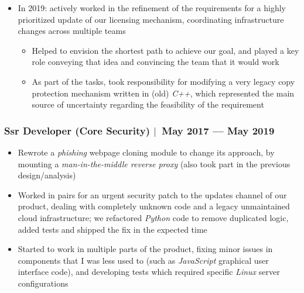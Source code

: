 \documentclass[12pt, a4paper]{article}
\newcommand{\mysep}{{\Large $\mid$}\ }
\newcommand{\timeFrame}[2]{{#1} --- {#2}}
\newcommand{\python}{\emph{Python}}
\newcommand{\cpp}{\emph{C++}}
\begin{document}
\begin{itemize}
\begin{itemize}
            into our codebase, requiring changes in our non-standard \python{} build system
            (due to the way in which the interpreter is customized and embedded in the product)
            \item In the end, we finished with a renewed cryptography stack,
            removing legacy bindings and with a simpler mechanism to integrate third party libraries
        \end{itemize}
        \item In 2019: actively worked in the refinement of the requirements
        for a highly prioritized update of our licensing mechanism,
        coordinating infrastructure changes across multiple teams
        \begin{itemize}
            \item Helped to envision the shortest path to achieve our goal,
            and played a key role conveying that idea
            and convincing the team that it would work
            \item As part of the tasks, took responsibility for modifying
            a very legacy copy protection mechanism written in (old) \cpp{},
            which represented the main source of uncertainty
            regarding the feasibility of the requirement
        \end{itemize}
    \end{itemize}

    \subsubsection*{Ssr Developer (Core Security) \mysep \timeFrame{May 2017}{May 2019}}
    \begin{itemize}
        \item Rewrote a \emph{phishing} webpage cloning module to change its approach,
        by mounting a \emph{man-in-the-middle reverse proxy}
        (also took part in the previous design/analysis)
        \item Worked in pairs for an urgent security patch
        to the updates channel of our product,
        dealing with completely unknown code
        and a legacy unmaintained cloud infrastructure;
        we refactored \python{} code to remove duplicated logic,
        added tests and shipped the fix in the expected time
        \item Started to work in multiple parts of the product,
        fixing minor issues in components that I was less used to
        (such as \emph{JavaScript} graphical user interface code),
        and developing tests which required specific \emph{Linux} server configurations
    \end{itemize}
\end{document}

